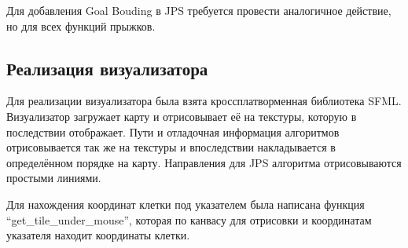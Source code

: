 Для добавления Goal Bouding в JPS требуется провести аналогичное действие, но для всех функций прыжков.

\subsection{Реализация визуализатора}

Для реализации визуализатора была взята кроссплатворменная библиотека SFML. Визуализатор загружает карту и отрисовывает её на текстуры, которую в последствии отображает. Пути и отладочная информация алгоритмов отрисовывается так же на текстуры и впоследствии накладывается в определённом порядке на карту. Направления для JPS алгоритма отрисовываются простыми линиями.

Для нахождения координат клетки под указателем была написана функция ``get\_tile\_under\_mouse'', которая по канвасу для отрисовки и координатам указателя находит координаты клетки. 
